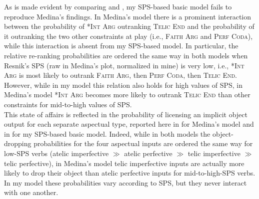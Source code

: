 As is made evident by comparing  and , my SPS-based basic model fails to reproduce Medina's findings. In Medina's model there is a prominent interaction between the probability of \textsc{*Int Arg} outranking \textsc{Telic End} and the probability of it outranking the two other constraints at play (i.e., \textsc{Faith Arg} and \textsc{Perf Coda}), while this interaction is absent from my SPS-based model. In particular, the relative re-ranking probabilities are ordered the same way in both models when Resnik's SPS (raw in Medina's plot, normalized in mine) is very low, i.e., \textsc{*Int Arg} is most likely to outrank \textsc{Faith Arg}, then \textsc{Perf Coda}, then \textsc{Telic End}. However, while in my model this relation also holds for high values of SPS, in Medina's model \textsc{*Int Arg} becomes more likely to outrank \textsc{Telic End} than other constraints for mid-to-high values of SPS.\\
This state of affairs is reflected in the probability of licensing an implicit object output for each separate aspectual type, reported here in  for Medina's model and in  for my SPS-based basic model. Indeed, while in both models the object-dropping probabilities for the four aspectual inputs are ordered the same way for low-SPS verbs (atelic imperfective $\gg$ atelic perfective $\gg$ telic imperfective $\gg$ telic perfective), in Medina's model telic imperfective inputs are actually more likely to drop their object than atelic perfective inputs for mid-to-high-SPS verbs. In my model these probabilities vary according to SPS, but they never interact with one another.\\
